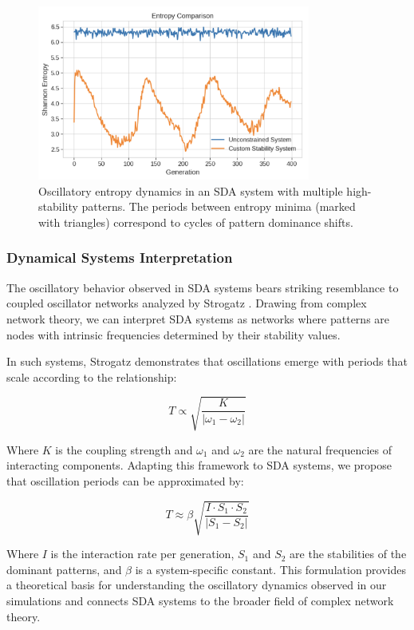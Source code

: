 \documentclass[preprint,12pt]{elsarticle}
\begin{document}
\begin{figure}[h]
    \centering
    \includegraphics[width=0.8\textwidth]{entropy_oscillations}
    \caption{Oscillatory entropy dynamics in an SDA system with multiple high-stability patterns. The periods between entropy minima (marked with triangles) correspond to cycles of pattern dominance shifts.}
    \label{fig:entropy_oscillations}
\end{figure}

\subsubsection{Dynamical Systems Interpretation}
The oscillatory behavior observed in SDA systems bears striking resemblance to coupled oscillator networks analyzed by Strogatz \cite{strogatz2001exploring}. Drawing from complex network theory, we can interpret SDA systems as networks where patterns are nodes with intrinsic frequencies determined by their stability values.

In such systems, Strogatz demonstrates that oscillations emerge with periods that scale according to the relationship:

\begin{equation}
T \propto \sqrt{\frac{K}{|\omega_1 - \omega_2|}}
\end{equation}

Where $K$ is the coupling strength and $\omega_1$ and $\omega_2$ are the natural frequencies of interacting components. Adapting this framework to SDA systems, we propose that oscillation periods can be approximated by:

\begin{equation}
T \approx \beta \sqrt{\frac{I \cdot S_1 \cdot S_2}{|S_1 - S_2|}}
\end{equation}

Where $I$ is the interaction rate per generation, $S_1$ and $S_2$ are the stabilities of the dominant patterns, and $\beta$ is a system-specific constant. This formulation provides a theoretical basis for understanding the oscillatory dynamics observed in our simulations and connects SDA systems to the broader field of complex network theory.
\end{document}
